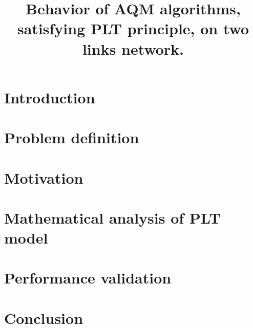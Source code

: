 \documentclass{sig-alternate}
\title{Behavior of AQM algorithms, satisfying PLT principle, on two links network.}
\begin{document}
\maketitle
\section{Introduction}

\section{Problem definition}

\section{Motivation}

\section{Mathematical analysis of PLT model}

\section{Performance validation}

\section{Conclusion}



\end{document}

